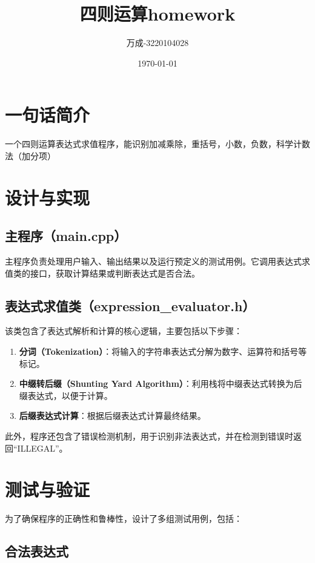 \documentclass[12pt]{article}
\title{四则运算homework}
\author{万成-3220104028}
\date{\today}
\begin{document}
\maketitle

\section{一句话简介}

一个四则运算表达式求值程序，能识别加减乘除，重括号，小数，负数，科学计数法（加分项）


\section{设计与实现}


\subsection{主程序（main.cpp）}

主程序负责处理用户输入、输出结果以及运行预定义的测试用例。它调用表达式求值类的接口，获取计算结果或判断表达式是否合法。

\subsection{表达式求值类（expression\_evaluator.h）}

该类包含了表达式解析和计算的核心逻辑，主要包括以下步骤：

\begin{enumerate}
    \item \textbf{分词（Tokenization）}：将输入的字符串表达式分解为数字、运算符和括号等标记。
    \item \textbf{中缀转后缀（Shunting Yard Algorithm）}：利用栈将中缀表达式转换为后缀表达式，以便于计算。
    \item \textbf{后缀表达式计算}：根据后缀表达式计算最终结果。
\end{enumerate}

此外，程序还包含了错误检测机制，用于识别非法表达式，并在检测到错误时返回“ILLEGAL”。

\section{测试与验证}

为了确保程序的正确性和鲁棒性，设计了多组测试用例，包括：

\subsection{合法表达式}
\end{document}
